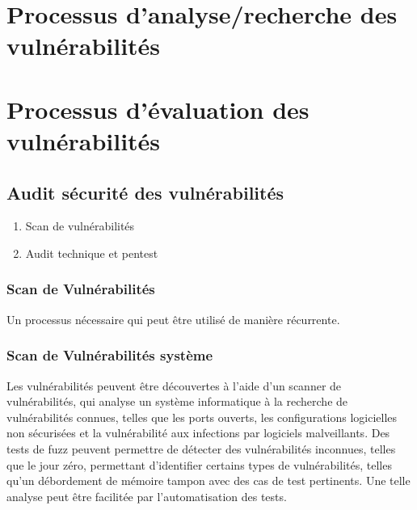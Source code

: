 \section{Processus d’analyse/recherche des vulnérabilités}

\section{Processus d’évaluation des vulnérabilités}



\subsection{Audit sécurité des vulnérabilités}

\begin{enumerate}
	\item Scan de vulnérabilités
	\item Audit technique et pentest
\end{enumerate}

\subsubsection{Scan de Vulnérabilités}
Un processus nécessaire qui peut être utilisé de manière récurrente.

\subsubsection{Scan de Vulnérabilités système}

Les vulnérabilités peuvent être découvertes à l'aide d'un scanner de vulnérabilités, qui analyse un système informatique à la recherche de vulnérabilités connues, telles que les ports ouverts, les configurations logicielles non sécurisées et la vulnérabilité aux infections par logiciels malveillants. Des tests de fuzz peuvent permettre de détecter des vulnérabilités inconnues, telles que le jour zéro, permettant d'identifier certains types de vulnérabilités, telles qu'un débordement de mémoire tampon avec des cas de test pertinents. Une telle analyse peut être facilitée par l’automatisation des tests. 

